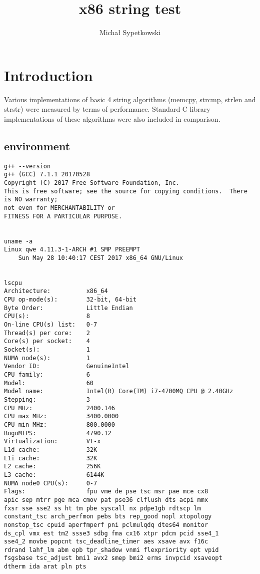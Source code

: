 \documentclass[11pt,a4paper]{article}
\title{x86 string test}
\author{Michał Sypetkowski}
\date{}
\begin{document}
\maketitle
\section{Introduction}\label{sec:intro}
Various implementations of basic 4 string algorithms (memcpy, strcmp, strlen and strstr) were measured by terms of performance.
Standard C library implementations of these algorithms were also included in comparison.

\subsection{environment}\label{subsec:environment}
\begin{lstlisting}[]
g++ --version
g++ (GCC) 7.1.1 20170528
Copyright (C) 2017 Free Software Foundation, Inc.
This is free software; see the source for copying conditions.  There is NO warranty;
not even for MERCHANTABILITY or
FITNESS FOR A PARTICULAR PURPOSE.


uname -a
Linux qwe 4.11.3-1-ARCH #1 SMP PREEMPT
    Sun May 28 10:40:17 CEST 2017 x86_64 GNU/Linux


lscpu
Architecture:          x86_64
CPU op-mode(s):        32-bit, 64-bit
Byte Order:            Little Endian
CPU(s):                8
On-line CPU(s) list:   0-7
Thread(s) per core:    2
Core(s) per socket:    4
Socket(s):             1
NUMA node(s):          1
Vendor ID:             GenuineIntel
CPU family:            6
Model:                 60
Model name:            Intel(R) Core(TM) i7-4700MQ CPU @ 2.40GHz
Stepping:              3
CPU MHz:               2400.146
CPU max MHz:           3400.0000
CPU min MHz:           800.0000
BogoMIPS:              4790.12
Virtualization:        VT-x
L1d cache:             32K
L1i cache:             32K
L2 cache:              256K
L3 cache:              6144K
NUMA node0 CPU(s):     0-7
Flags:                 fpu vme de pse tsc msr pae mce cx8
apic sep mtrr pge mca cmov pat pse36 clflush dts acpi mmx
fxsr sse sse2 ss ht tm pbe syscall nx pdpe1gb rdtscp lm
constant_tsc arch_perfmon pebs bts rep_good nopl xtopology
nonstop_tsc cpuid aperfmperf pni pclmulqdq dtes64 monitor
ds_cpl vmx est tm2 ssse3 sdbg fma cx16 xtpr pdcm pcid sse4_1
sse4_2 movbe popcnt tsc_deadline_timer aes xsave avx f16c
rdrand lahf_lm abm epb tpr_shadow vnmi flexpriority ept vpid
fsgsbase tsc_adjust bmi1 avx2 smep bmi2 erms invpcid xsaveopt
dtherm ida arat pln pts

\end{lstlisting}
\end{document}
